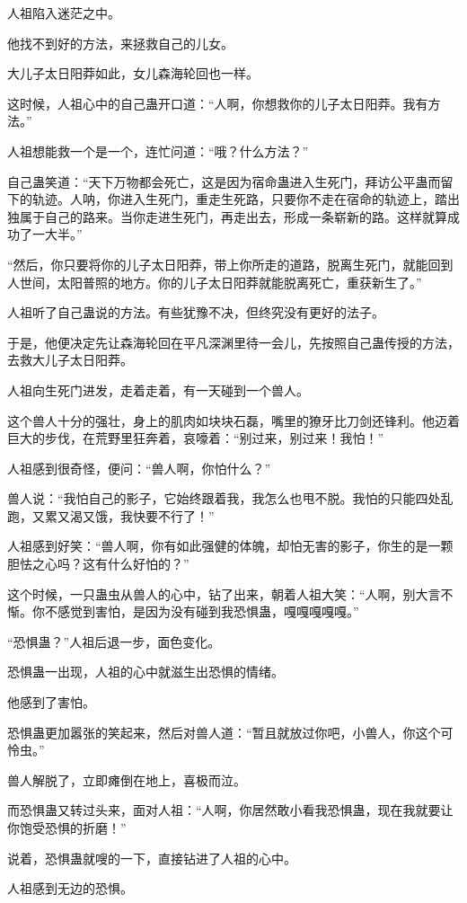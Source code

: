 \begin{this_body}
人祖陷入迷茫之中。

他找不到好的方法，来拯救自己的儿女。

大儿子太日阳莽如此，女儿森海轮回也一样。

这时候，人祖心中的自己蛊开口道：“人啊，你想救你的儿子太日阳莽。我有方法。”

人祖想能救一个是一个，连忙问道：“哦？什么方法？”

自己蛊笑道：“天下万物都会死亡，这是因为宿命蛊进入生死门，拜访公平蛊而留下的轨迹。人呐，你进入生死门，重走生死路，只要你不走在宿命的轨迹上，踏出独属于自己的路来。当你走进生死门，再走出去，形成一条崭新的路。这样就算成功了一大半。”

“然后，你只要将你的儿子太日阳莽，带上你所走的道路，脱离生死门，就能回到人世间，太阳普照的地方。你的儿子太日阳莽就能脱离死亡，重获新生了。”

人祖听了自己蛊说的方法。有些犹豫不决，但终究没有更好的法子。

于是，他便决定先让森海轮回在平凡深渊里待一会儿，先按照自己蛊传授的方法，去救大儿子太日阳莽。

人祖向生死门进发，走着走着，有一天碰到一个兽人。

这个兽人十分的强壮，身上的肌肉如块块石磊，嘴里的獠牙比刀剑还锋利。他迈着巨大的步伐，在荒野里狂奔着，哀嚎着：“别过来，别过来！我怕！”

人祖感到很奇怪，便问：“兽人啊，你怕什么？”

兽人说：“我怕自己的影子，它始终跟着我，我怎么也甩不脱。我怕的只能四处乱跑，又累又渴又饿，我快要不行了！”

人祖感到好笑：“兽人啊，你有如此强健的体魄，却怕无害的影子，你生的是一颗胆怯之心吗？这有什么好怕的？”

这个时候，一只蛊虫从兽人的心中，钻了出来，朝着人祖大笑：“人啊，别大言不惭。你不感觉到害怕，是因为没有碰到我恐惧蛊，嘎嘎嘎嘎嘎。”

“恐惧蛊？”人祖后退一步，面色变化。

恐惧蛊一出现，人祖的心中就滋生出恐惧的情绪。

他感到了害怕。

恐惧蛊更加嚣张的笑起来，然后对兽人道：“暂且就放过你吧，小兽人，你这个可怜虫。”

兽人解脱了，立即瘫倒在地上，喜极而泣。

而恐惧蛊又转过头来，面对人祖：“人啊，你居然敢小看我恐惧蛊，现在我就要让你饱受恐惧的折磨！”

说着，恐惧蛊就嗖的一下，直接钻进了人祖的心中。

人祖感到无边的恐惧。


\end{this_body}
